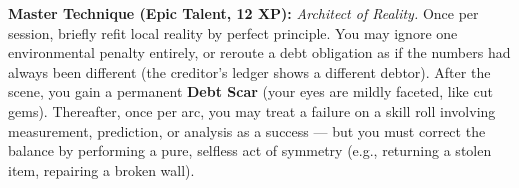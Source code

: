 \begin{tcolorbox}[colback=black!5,colframe=violet!70!black,title=\textbf{Measure-Fist (Sacred Geometry)},breakable]
  \vspace{2mm}
  \noindent\textbf{Master Technique (Epic Talent, 12 XP):}
  \textit{Architect of Reality.} Once per session, briefly refit local reality by perfect principle. You may ignore one environmental penalty entirely, or reroute a debt obligation as if the numbers had always been different (the creditor's ledger shows a different debtor). After the scene, you gain a permanent \textbf{Debt Scar} (your eyes are mildly faceted, like cut gems). Thereafter, once per arc, you may treat a failure on a skill roll involving measurement, prediction, or analysis as a success --- but you must correct the balance by performing a pure, selfless act of symmetry (e.g., returning a stolen item, repairing a broken wall).
\end{tcolorbox}